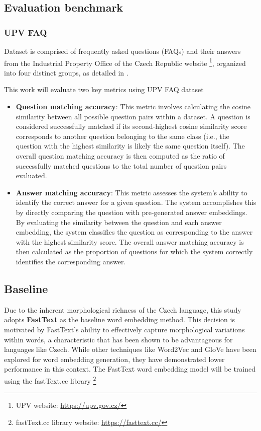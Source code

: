 \subsection{Evaluation  benchmark}

\subsubsection{UPV FAQ}

Dataset is comprised of frequently asked questions (FAQs) and their answers from the Industrial Property Office of the Czech Republic website \footnote{UPV website: \url{https://upv.gov.cz/}}, organized into four distinct groups, as detailed in .

This work will evaluate two key metrics using UPV FAQ dataset
\begin{itemize}
  \item \textbf{Question matching accuracy}:
    This metric involves calculating the cosine similarity between all possible question pairs within a dataset.
    A question is considered successfully matched if its second-highest cosine similarity score corresponds to another question belonging to the same class (i.e., the question with the highest similarity is likely the same question itself). 
    The overall question matching accuracy is then computed as the ratio of successfully matched questions to the total number of question pairs evaluated.  
  \item \textbf{Answer matching accuracy}:
    This metric assesses the system's ability to identify the correct answer for a given question.
    The system accomplishes this by directly comparing the question with pre-generated answer embeddings.
    By evaluating the similarity between the question and each answer embedding, the system classifies the question as corresponding to the answer with the highest similarity score.
    The overall answer matching accuracy is then calculated as the proportion of questions for which the system correctly identifies the corresponding answer.  
\end{itemize}



\subsection{Baseline}
Due to the inherent morphological richness of the Czech language, this study adopts \textbf{FastText} as the baseline word embedding method.
This decision is motivated by FastText's ability to effectively capture morphological variations within words, a characteristic that has been shown to be advantageous for languages like Czech.
While other techniques like Word2Vec and \ac{GloVe} have been explored for word embedding generation, they have demonstrated lower performance in this context.
The FastText word embedding model will be trained using the fastText.cc library \footnote{fastText.cc library website: \url{https://fasttext.cc/}}

